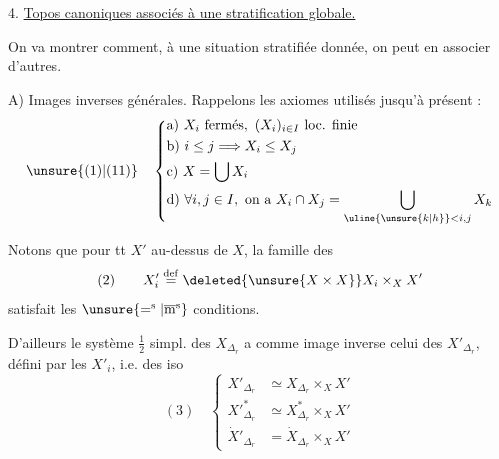 4. \uline{Topos canoniques associés à une stratification globale.}

On va montrer comment, à une situation stratifiée donnée, on peut en associer d'autres.

A) Images inverses générales. Rappelons les axiomes utilisés jusqu'à présent :
\[
\unsure{(1)|(11)}\quad\left\{\begin{aligned}
&\text{a) }X_i\text{ fermés},\ (X_i)_{i\in I}\text{ loc. finie}\\
&\text{b) }i\leq j\Longrightarrow X_i\leq X_j\\
&\text{c) }X=\bigcup X_i\\
&\text{d) }\forall i,j\in I,\text{ on a }X_i\cap X_j=\bigcup_{\uline{\unsure{k|h}}<i,j}X_k
\end{aligned}\right.
\]

Notons que pour tt $X'$ au-dessus de $X$, la famille des
\[
(2)\qquad X'_i\overset{\mathrm{def}}=\deleted{\unsure{X\times X}}X_i\times_X X'
\]
satisfait les  $\unsure{=^{\mathrm s}|\overline{\mathrm m}^{\mathrm s}}$ conditions.

D'ailleurs le système $\frac12$ simpl. des $X_{\Delta_r}$ a comme image inverse celui des $X'_{\Delta_r}$, défini par les $X'_i$,  i.e. des iso
\[
(3)\quad\left\{\begin{aligned}
X'_{\Delta_r}&\simeq X_{\Delta_r}\times_X X'\\
X'^{*}_{\Delta_r}&\simeq X^*_{\Delta_r}\times_X X'\\
\dot X'_{\Delta_r}&=\dot X_{\Delta_r}\times_X X'
\end{aligned}\right.
\]

